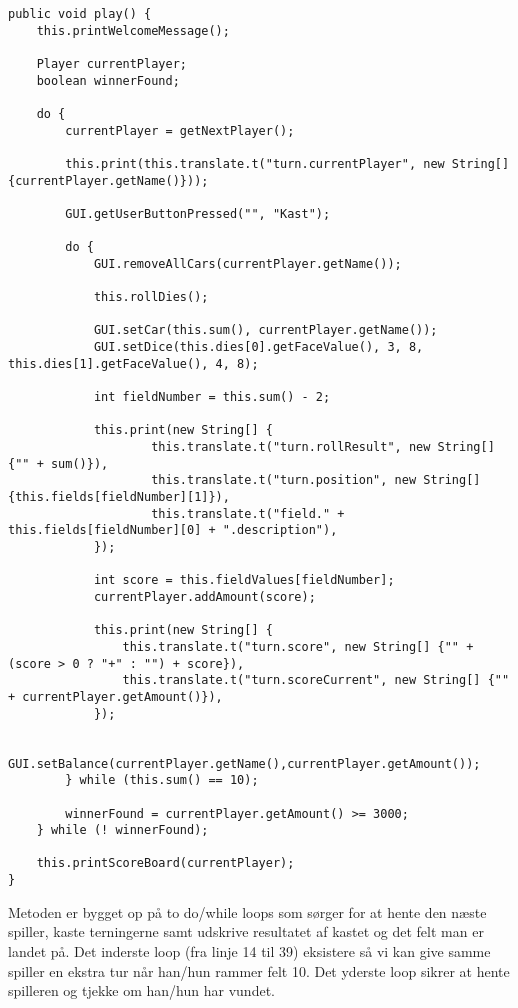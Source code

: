 \begin{lstlisting}
public void play() {
    this.printWelcomeMessage();

    Player currentPlayer;
    boolean winnerFound;

    do {
        currentPlayer = getNextPlayer();

        this.print(this.translate.t("turn.currentPlayer", new String[] {currentPlayer.getName()}));

        GUI.getUserButtonPressed("", "Kast");

        do {
            GUI.removeAllCars(currentPlayer.getName());

            this.rollDies();

            GUI.setCar(this.sum(), currentPlayer.getName());
            GUI.setDice(this.dies[0].getFaceValue(), 3, 8, this.dies[1].getFaceValue(), 4, 8);

            int fieldNumber = this.sum() - 2;

            this.print(new String[] {
                    this.translate.t("turn.rollResult", new String[] {"" + sum()}),
                    this.translate.t("turn.position", new String[] {this.fields[fieldNumber][1]}),
                    this.translate.t("field." + this.fields[fieldNumber][0] + ".description"),
            });

            int score = this.fieldValues[fieldNumber];
            currentPlayer.addAmount(score);

            this.print(new String[] {
                this.translate.t("turn.score", new String[] {"" + (score > 0 ? "+" : "") + score}),
                this.translate.t("turn.scoreCurrent", new String[] {"" + currentPlayer.getAmount()}),
            });

            GUI.setBalance(currentPlayer.getName(),currentPlayer.getAmount());
        } while (this.sum() == 10);

        winnerFound = currentPlayer.getAmount() >= 3000;
    } while (! winnerFound);

    this.printScoreBoard(currentPlayer);
}
\end{lstlisting}
\vspace{2ex}

\noindent Metoden er bygget op på to do/while loops som sørger for at hente den næste spiller, kaste terningerne samt udskrive resultatet af kastet og det felt man er landet på.
Det inderste loop (fra linje 14 til 39) eksistere så vi kan give samme spiller en ekstra tur når han/hun rammer felt 10.
Det yderste loop sikrer at hente spilleren og tjekke om han/hun har vundet.
\\

